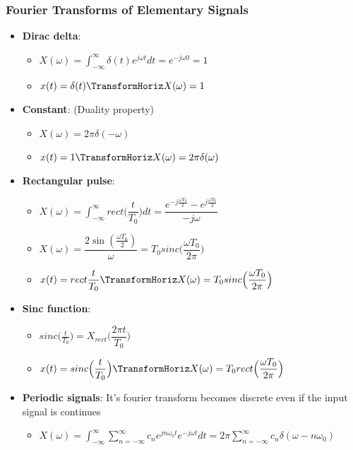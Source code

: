 \documentclass{article}
\begin{document}
\subsubsection{Fourier Transforms of Elementary Signals}
\begin{itemize}
    \item \textbf{Dirac delta}:  
    \begin{itemize}
        \item $X(\omega) = \int_{-\infty}^{\infty} \delta(t)e^{j\omega t} dt = e^{-j\omega0} = 1$
        \item $x(t)=\delta(t) \TransformHoriz X(\omega)=1$
    \end{itemize}
    \item \textbf{Constant}: (Duality property)
    \begin{itemize}
        \item $X(\omega) = 2\pi\delta(-\omega)$
        \item $x(t)=1 \TransformHoriz X(\omega)=2\pi\delta(\omega)$
    \end{itemize}
    \item \textbf{Rectangular pulse}:
    \begin{itemize}
        \item $X(\omega) = \int_{-\infty}^{\infty} rect\Big( \dfrac{t}{T_0} \Big) dt = \dfrac{e^{-j\frac{\omega T_0}{2}}-e^{j\frac{\omega T_0}{2}}}{-j\omega}$
        \item $X(\omega) = \dfrac{2\sin(\frac{\omega T_0}{2})}{\omega} = T_0 sinc\Big( \dfrac{\omega T_0}{2\pi} \Big)$
        \item $x(t)=rect\dfrac{t}{T_0} \TransformHoriz X(\omega) = T_0 sinc\Big( \dfrac{\omega T_0}{2\pi} \Big)$
    \end{itemize}
    \item \textbf{Sinc function}:
    \begin{itemize}
        \item $sinc\Big( \frac{t}{T_0} \Big) = X_{rect}\Big( \dfrac{2\pi t}{T_0} \Big)$
        \item $x(t) = sinc\Big( \dfrac{t}{T_0} \Big) \TransformHoriz X(\omega) = T_0 rect\Big( \dfrac{\omega T_0}{2\pi} \Big)$
    \end{itemize}
    \item \textbf{Periodic signals}: It's fourier transform becomes discrete even if the input signal is continues
    \begin{itemize}
        \item $X(\omega) = \int_{-\infty}^{\infty} \sum_{n=-\infty}^{\infty} c_n e^{jn\omega_0 t} e^{-j\omega t} dt = 2\pi\sum_{n=-\infty}^{\infty} c_n \delta(\omega -n\omega_0)$
    \end{itemize}
\end{itemize}
\end{document}

